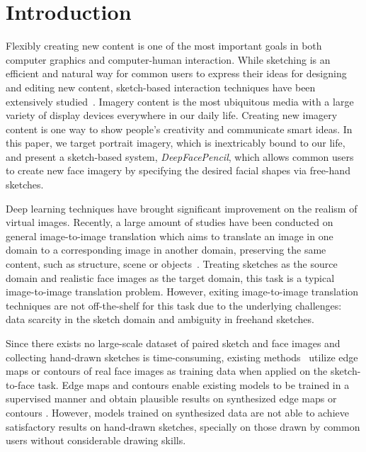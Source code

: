 
\section{Introduction}


Flexibly creating new content is one of the most important goals in both computer graphics and computer-human interaction. While sketching is an efficient and natural way for common users to express their ideas for designing and editing new content, sketch-based interaction techniques have been extensively studied~\cite{SutherlandSketchPad64,Zeleznik-Sketch96,Igarashi-teddy99,Chen_sketchingreality08,Chen09sketch2photo}. 
Imagery content is the most ubiquitous media with a large variety of display devices everywhere in our daily life. 
Creating new imagery content is one way to show people's creativity and communicate smart ideas.
%
In this paper, we target portrait imagery, which is inextricably bound to our life, and present a sketch-based system, \emph{DeepFacePencil}, which allows common users to create new face imagery by specifying the desired facial shapes via free-hand sketches. 

Deep learning techniques have brought significant improvement on the realism of virtual images. 
Recently, a large amount of studies have been conducted on general image-to-image translation which aims to translate an image in one domain to a corresponding image in another domain, preserving the same content, such as structure, scene or objects~\cite{pix2pix,pix2pixHD,CycleGANs,DiscoGANs, DualGANs,BicycleGANs}. 
%
Treating sketches as the source domain and realistic face images as the target domain, this task is a typical image-to-image translation problem.
However, exiting image-to-image translation techniques are not off-the-shelf for this task due to the underlying challenges: data scarcity in the sketch domain and ambiguity in freehand sketches. 


Since there exists no large-scale dataset of paired sketch and face images and collecting hand-drawn sketches is time-consuming, existing methods~\cite{pix2pix, pix2pixHD, Lines2Face} utilize edge maps or contours of real face images as training data when applied on the sketch-to-face task. Edge maps and contours enable existing models to be trained in a supervised manner and obtain plausible results on synthesized edge maps or contours . 
%
However, models trained on synthesized data are not able to achieve satisfactory results on hand-drawn sketches, specially on those drawn by common users without considerable drawing skills. 

